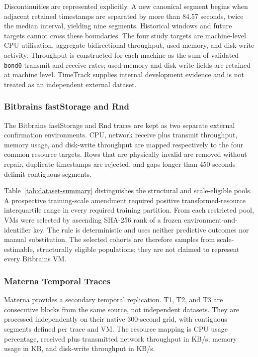 \documentclass[a4paper,fleqn]{cas-dc}
\begin{document}
Discontinuities are represented explicitly.  A new canonical segment begins
when adjacent retained timestamps are separated by more than 84.57 seconds,
twice the median interval, yielding nine segments.  Historical windows and
future targets cannot cross these boundaries.  The four study targets are
machine-level CPU utilisation, aggregate bidirectional throughput, used memory,
and disk-write activity.  Throughput is constructed for each machine as the sum
of validated \texttt{bond0} transmit and receive rates; used-memory and
disk-write fields are retained at machine level.  TimeTrack supplies internal
development evidence and is not treated as an independent external dataset.

\subsubsection{Bitbrains fastStorage and Rnd}
\label{sec:bitbrains-data}

The Bitbrains fastStorage and Rnd traces are kept as two separate external
confirmation environments.  CPU,
network receive plus transmit throughput, memory usage, and disk-write
throughput are mapped respectively to the four common resource targets.  Rows
that are physically invalid are removed without repair, duplicate timestamps
are rejected, and gaps longer than 450 seconds delimit contiguous segments.

Table~\ref{tab:dataset-summary} distinguishes the structural and scale-eligible
pools. A prospective training-scale amendment required positive
transformed-resource interquartile range in every required training partition.
From each restricted pool, VMs were selected by ascending
SHA-256 rank of a frozen environment-and-identifier key.  The rule is
deterministic and uses neither predictive outcomes nor manual substitution.
The selected cohorts are therefore samples from scale-estimable, structurally
eligible populations; they are not claimed to represent every Bitbrains VM.

\subsubsection{Materna Temporal Traces}
\label{sec:materna-data}

Materna provides a secondary temporal replication.  T1, T2, and T3 are
consecutive blocks from the same source, not independent datasets.  They are
processed independently on their native 300-second grid, with contiguous
segments defined per trace and VM.  The resource mapping is CPU usage
percentage, received plus transmitted network throughput in KB/s, memory usage
in KB, and disk-write throughput in KB/s.
\end{document}
